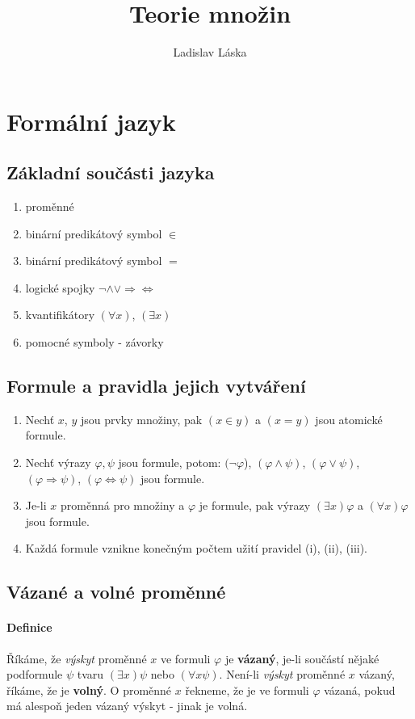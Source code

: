 \documentclass[a4paper,12pt,titlepage]{article}
\title{Teorie množin}
\author{Ladislav Láska}
\newcommand{\EnumRoman}{
\renewcommand{\theenumi}{(\roman{enumi})}
\renewcommand{\labelenumi}{\theenumi}
}
\begin{document}
\maketitle
\newpage
\tableofcontents
\newpage

\section{Formální jazyk}
\setcounter{equation}{0}
\subsection{Základní součásti jazyka}
\setcounter{equation}{0}
\begin{enumerate}
	\item proměnné
	\item binární predikátový symbol $\in$
	\item binární predikátový symbol $=$
	\item logické spojky $\neg \land \lor \Rightarrow \Leftrightarrow$
	\item kvantifikátory $(\forall x)$, $(\exists x)$
	\item pomocné symboly - závorky
\end{enumerate}
\subsection{Formule a pravidla jejich vytváření}
\setcounter{equation}{0}
{
\EnumRoman
\begin{enumerate}
	\item Nechť $x$, $y$ jsou prvky množiny, pak $(x \in y)$ a $(x = y)$ jsou
	atomické formule.
	\item Nechť výrazy $\varphi, \psi$ jsou formule, potom:
			$(\neg \varphi$), $(\varphi \land \psi)$, $(\varphi \lor \psi)$,
			$(\varphi \Rightarrow \psi)$, $(\varphi \Leftrightarrow \psi)$
			jsou formule.
	\item Je-li $x$ proměnná pro množiny a $\varphi$ je formule, pak výrazy
	$(\exists x) \varphi$ a $(\forall x) \varphi$ jsou formule.
	\item Každá formule vznikne konečným počtem užití pravidel (i), (ii), (iii).
\end{enumerate}
}
\subsection{Vázané a volné proměnné}
\setcounter{equation}{0}
\paragraph{Definice}
Říkáme, že \textit{výskyt} proměnné $x$ ve formuli $\varphi$ je \textbf{vázaný}, 
je-li součástí nějaké podformule $\psi$ tvaru $(\exists x) \psi$ nebo $(\forall 
x \psi)$. Není-li \textit{výskyt} proměnné $x$ vázaný, říkáme, že je 
\textbf{volný}.  O proměnné $x$ řekneme, že je ve formuli $\varphi$ vázaná, 
pokud má alespoň jeden vázaný výskyt - jinak je volná.
\end{document}
